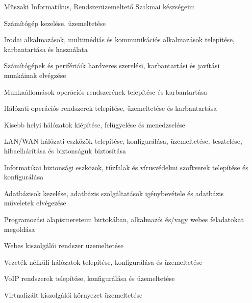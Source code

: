 \begin{cventries}
  \cventry
    {Műszaki Informatikus, Rendszerüzemeltető} %
    {Szakmai készségeim} %
    {} %
    {} %
    {
      \begin{cvitems} %
        \item {Számítógép kezelése, üzemeltetése}
        \item {Irodai alkalmazások, multimédiás és kommunikációs alkalmazások telepítése, karbantartása és használata}
        \item {Számítógépek és perifériáik hardveres szerelési, karbantartási és javítási munkáinak elvégzése}
        \item{Munkaállomások operációs rendszerének telepítése és karbantartása}
        \item{Hálózati operációs rendszerek telepítése, üzemeltetése és karbantartása}
        \item{Kisebb helyi hálózatok kiépítése, felügyelése és menedzselése}
        \item{LAN/WAN hálózati eszközök telepítése, konfigurálása, üzemeltetése, tesztelése, hibaelhárítása és biztonságuk biztosítása}
        \item{Informatikai biztonsági eszközök, tűzfalak és vírusvédelmi szoftverek telepítése és konfigurálása}
        \item{Adatbázisok kezelése, adatbázis szolgáltatások igénybevétele és adatbázis műveletek elvégezése}
        \item{Programozási alapismereteim birtokában, alkalmazói és/vagy webes feladatokat megoldása}
        \item{Webes kiszolgálói rendszer üzemeltetése}
        \item{Vezeték nélküli hálózatok telepítése, konfigurálása és üzemeltetése}
        \item{VoIP rendszerek telepítése, konfigurálása és üzemeltetése}
        \item{Virtualizált kiszolgálói környezet üzemeltetése}
      \end{cvitems}
    }

\end{cventries}
